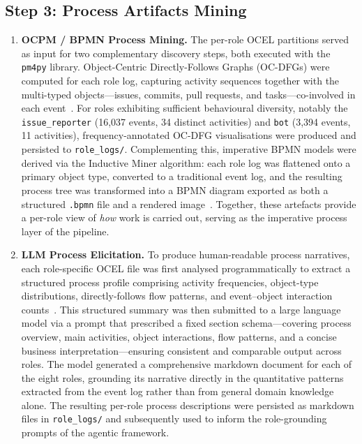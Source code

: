 \subsection{Step 3: Process Artifacts Mining}

\begin{enumerate}

    \item \textbf{OCPM / BPMN Process Mining.}
    The per-role OCEL partitions served as input for two complementary discovery steps, both executed with the \texttt{pm4py} library.
    Object-Centric Directly-Follows Graphs (OC-DFGs) were computed for each role log, capturing activity sequences together with the multi-typed objects—issues, commits, pull requests, and tasks—co-involved in each event~\cite{notebook:05}.
    For roles exhibiting sufficient behavioural diversity, notably the \texttt{issue\_reporter} (16{,}037 events, 34 distinct activities) and \texttt{bot} (3{,}394 events, 11 activities), frequency-annotated OC-DFG visualisations were produced and persisted to \texttt{role\_logs/}.
    Complementing this, imperative BPMN models were derived via the Inductive Miner algorithm: each role log was flattened onto a primary object type, converted to a traditional event log, and the resulting process tree was transformed into a BPMN diagram exported as both a structured \texttt{.bpmn} file and a rendered image~\cite{notebook:08}.
    Together, these artefacts provide a per-role view of \emph{how} work is carried out, serving as the imperative process layer of the pipeline.

    \item \textbf{LLM Process Elicitation.}
    To produce human-readable process narratives, each role-specific OCEL file was first analysed programmatically to extract a structured process profile comprising activity frequencies, object-type distributions, directly-follows flow patterns, and event--object interaction counts~\cite{notebook:07}.
    This structured summary was then submitted to a large language model via a prompt that prescribed a fixed section schema—covering process overview, main activities, object interactions, flow patterns, and a concise business interpretation—ensuring consistent and comparable output across roles.
    The model generated a comprehensive markdown document for each of the eight roles, grounding its narrative directly in the quantitative patterns extracted from the event log rather than from general domain knowledge alone.
    The resulting per-role process descriptions were persisted as markdown files in \texttt{role\_logs/} and subsequently used to inform the role-grounding prompts of the agentic framework.


\end{enumerate}
